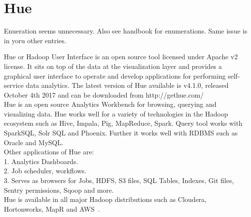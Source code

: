 \section{Hue}

\begin{NOTE}
Enueration seems unnecessary. Also see handbook for enumerations. Same
issue is in yoru other entries.
\end{NOTE}

Hue or Hadoop User Interface is an open source tool licensed 
under Apache v2 license. It sits on top of the data at the 
visualization layer and provides a graphical user interface to 
operate and develop applications for performing self-service 
data analytics.
The latest version of Hue available is v4.1.0, released October 
4th 2017 and can be downloaded from http://gethue.com/
~\cite{hid-sp18-517-hue-apache} \\

Hue is an open source Analytics Workbench for browsing, querying 
and visualizing data.
Hue works well for a variety of technologies in the Hadoop 
ecosystem such as Hive, Impala, Pig, MapReduce, Spark. Query 
tool works with SparkSQL, Solr SQL and Phoenix. Further it works 
well with RDBMS such as Oracle and MySQL. \\

Other applications of Hue are: \\

1. Analytics Dashboards. \\
2. Job scheduler, workflows. \\
3. Serves as browsers for Jobs, HDFS, S3 files, SQL Tables, Indexes, 
Git files, Sentry permissions, Sqoop and more. \\

Hue is available in all major Hadoop distributions such as Cloudera, 
Hortonworks, MapR and AWS~\cite{hid-sp18-517-Hue-wiki}.

